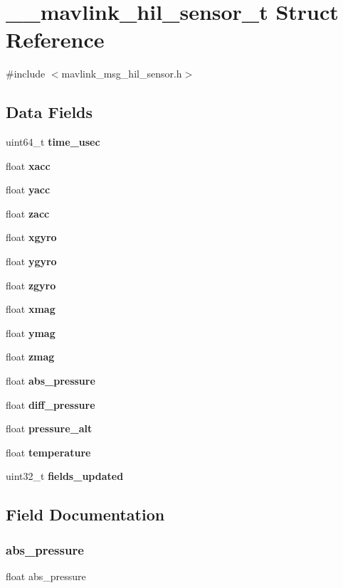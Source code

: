 \section{\+\_\+\+\_\+mavlink\+\_\+hil\+\_\+sensor\+\_\+t Struct Reference}
\label{struct____mavlink__hil__sensor__t}


{\ttfamily \#include $<$mavlink\+\_\+msg\+\_\+hil\+\_\+sensor.\+h$>$}

\subsection*{Data Fields}
\begin{DoxyCompactItemize}
\item 
uint64\+\_\+t \textbf{ time\+\_\+usec}
\item 
float \textbf{ xacc}
\item 
float \textbf{ yacc}
\item 
float \textbf{ zacc}
\item 
float \textbf{ xgyro}
\item 
float \textbf{ ygyro}
\item 
float \textbf{ zgyro}
\item 
float \textbf{ xmag}
\item 
float \textbf{ ymag}
\item 
float \textbf{ zmag}
\item 
float \textbf{ abs\+\_\+pressure}
\item 
float \textbf{ diff\+\_\+pressure}
\item 
float \textbf{ pressure\+\_\+alt}
\item 
float \textbf{ temperature}
\item 
uint32\+\_\+t \textbf{ fields\+\_\+updated}
\end{DoxyCompactItemize}


\subsection{Field Documentation}
\mbox{\label{struct____mavlink__hil__sensor__t_aef39c100f9e8e93dfd70750e443eaf8c}} 
\subsubsection{abs\+\_\+pressure}
{\footnotesize\ttfamily float abs\+\_\+pressure}

